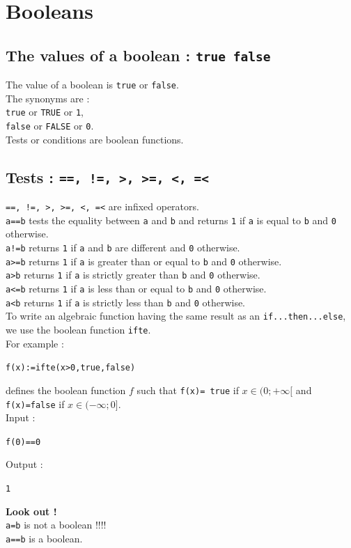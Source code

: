 \documentclass[a4paper,11pt]{book}
\begin{document}
\section{Booleans}
\subsection{The values of a boolean : {\tt true false}}
The value of a boolean is {\tt true} or {\tt false}.\\
The synonyms are :\\
{\tt true} or {\tt TRUE} or {\tt 1},\\
{\tt false} or {\tt FALSE} or {\tt 0}.\\
Tests or conditions are boolean functions.

\subsection{Tests : {\tt ==, !=, >, >=, <, =<}}\index{==}\index{>}\index{<}\index{>=}\index{<=}
{\tt ==, !=, >, >=, <, =<} are infixed operators.\\
{\tt a==b} tests the equality between {\tt a} and {\tt b} and returns {\tt 1} 
if {\tt a} is equal to {\tt b} and {\tt 0} otherwise.\\ 
{\tt a!=b} returns {\tt 1} if {\tt a} and {\tt b} are different and {\tt 0} 
otherwise.\\
 {\tt a>=b} returns {\tt 1} if {\tt a} is greater than or equal to {\tt b} 
and {\tt 0} otherwise.\\ 
{\tt a>b} returns {\tt 1} if {\tt a} is strictly greater than {\tt b}
and {\tt 0} otherwise.\\ 
{\tt a<=b} returns {\tt 1} if {\tt a} is less than or equal to {\tt b} and 
{\tt 0} otherwise.\\
{\tt a<b} returns {\tt 1} if {\tt a} is strictly less than {\tt b} 
and {\tt 0} otherwise.\\ 
To write an algebraic function having the same result as an 
{\tt if...then...else}, we use the boolean function {\tt ifte}.\\
For example :  
\begin{center}{\tt f(x):=ifte(x>0,true,false)}\end{center}
defines the boolean function $f$ such that {\tt f(x)= true} if 
$x \in (0;+\infty[$ and {\tt f(x)=false} if $x \in (-\infty;0]$.\\
Input :
\begin{center}{\tt f(0)==0}\end{center}
Output :
\begin{center}{\tt 1}\end{center}
{\bf Look out !}\\
{\tt a=b}  is not a boolean !!!!\\
{\tt a==b} is a boolean.\\
\end{document}
